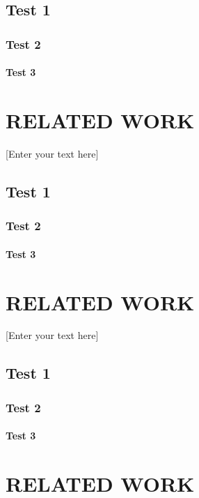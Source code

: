 \documentclass[oneside,11pt]{memoir}
\begin{document}
\section{Test 1}
\subsection{Test 2}
\subsubsection{Test 3}

\clearpage




\chapter{RELATED WORK} 

\DoubleSpacing
\setlength{\parindent}{.5in}
[Enter your text here]

\section{Test 1}
\subsection{Test 2}
\subsubsection{Test 3}
\clearpage


\chapter{RELATED WORK} 

\DoubleSpacing
\setlength{\parindent}{.5in}
[Enter your text here]
\section{Test 1}
\subsection{Test 2}
\subsubsection{Test 3}
\clearpage


\chapter{RELATED WORK} 
\end{document}
